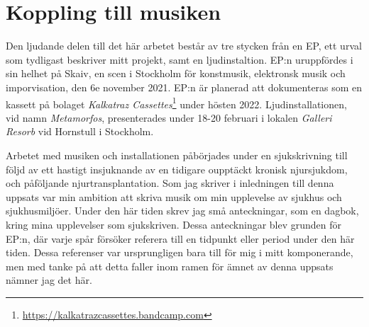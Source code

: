 \documentclass{article}
\begin{document}

\section{Koppling till musiken}
Den ljudande delen till det här arbetet består av tre stycken från en EP, ett urval som tydligast beskriver
mitt projekt, samt en ljudinstaltion. EP:n uruppfördes i sin helhet på Skaiv, en scen i Stockholm för
konstmusik, elektronsk musik och imporvisation, den 6e november 2021. EP:n är planerad att dokumenteras som en
kassett på bolaget \emph{Kalkatraz Cassettes}\footnote{\url{https://kalkatrazcassettes.bandcamp.com}} under hösten 2022.
Ljudinstallationen, vid namn \emph{Metamorfos}, presenterades under 18-20 februari i lokalen \emph{Galleri
Resorb} vid Hornstull i Stockholm. 

Arbetet med musiken och installationen påbörjades under en sjukskrivning till följd av ett hastigt
insjuknande av en tidigare oupptäckt kronisk njursjukdom, och påföljande njurtransplantation. Som jag skriver
i inledningen till denna uppsats var min ambition att skriva musik om min upplevelse av sjukhus och
sjukhusmiljöer. Under den här tiden skrev jag små anteckningar, som en dagbok, kring mina upplevelser som
sjukskriven. Dessa anteckningar blev grunden för EP:n, där varje spår försöker referera till en tidpunkt eller
period under den här tiden. Dessa referenser var ursprungligen bara till för mig i mitt komponerande, men med
tanke på att detta faller inom ramen för ämnet av denna uppsats nämner jag det här. 


\end{document}
